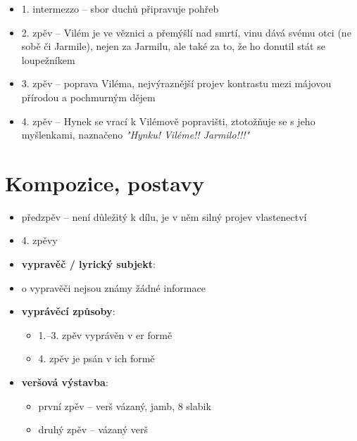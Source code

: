 \documentclass[10pt,a4paper]{article}
\begin{document}
\begin{itemize}
\begin{itemize}
\begin{itemize}
		\item 1. intermezzo -- sbor duchů připravuje pohřeb
		\item 2. zpěv -- Vilém je ve věznici a přemýšlí nad smrtí, vinu dává svému otci (ne sobě či Jarmile), nejen za Jarmilu, ale také za to, že ho donutil stát se loupežníkem
		\item 3. zpěv -- poprava Viléma, nejvýraznější projev kontrastu mezi májovou přírodou a pochmurným dějem
		\item 4. zpěv -- Hynek se vrací k Vilémově popravišti, ztotožňuje se s jeho myšlenkami, naznačeno \textit{"Hynku! Viléme!! Jarmilo!!!"}
		\end{itemize}
	\end{itemize}
\end{itemize}
\section*{Kompozice, postavy}
\begin{itemize}
\item předzpěv -- není důležitý k dílu, je v něm silný projev vlastenectví
\item 4. zpěvy
\item \textbf{vypravěč / lyrický subjekt}: 
	\item o vypravěči nejsou známy žádné informace
\item \textbf{vyprávěcí způsoby}:
	\begin{itemize}
	\item 1.--3. zpěv vyprávěn v er formě
	\item 4. zpěv je psán v ich formě
	\end{itemize}
\item \textbf{veršová výstavba}:	
	\begin{itemize}
	\item první zpěv -- verš vázaný, jamb, 8 slabik
	\item druhý zpěv -- vázaný verš
	\end{itemize}

\end{itemize}
\end{document}
